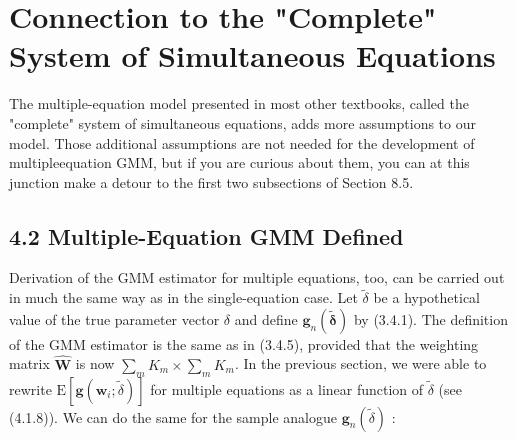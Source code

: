 \documentclass[10pt]{article}
\begin{document}
\section*{Connection to the "Complete" System of Simultaneous Equations}
The multiple-equation model presented in most other textbooks, called the "complete" system of simultaneous equations, adds more assumptions to our model. Those additional assumptions are not needed for the development of multipleequation GMM, but if you are curious about them, you can at this junction make a detour to the first two subsections of Section 8.5.

\subsection*{4.2 Multiple-Equation GMM Defined}
Derivation of the GMM estimator for multiple equations, too, can be carried out in much the same way as in the single-equation case. Let $\tilde{\delta}$ be a hypothetical value of the true parameter vector $\delta$ and define $\mathbf{g}_{n}(\tilde{\boldsymbol{\delta}})$ by (3.4.1). The definition of the GMM estimator is the same as in (3.4.5), provided that the weighting matrix $\widehat{\mathbf{W}}$ is now $\sum_{m} K_{m} \times \sum_{m} K_{m}$. In the previous section, we were able to rewrite $\mathrm{E}\left[\mathbf{g}\left(\mathbf{w}_{i} ; \tilde{\delta}\right)\right]$ for multiple equations as a linear function of $\tilde{\delta}$ (see (4.1.8)). We can do the same for the sample analogue $\mathbf{g}_{n}(\tilde{\delta})$ :
\end{document}
